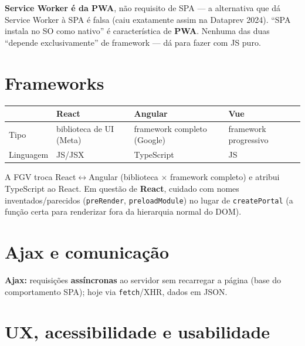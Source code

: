 \begin{pegadinha}
\textbf{Service Worker é da PWA}, não requisito de SPA --- a alternativa que
dá Service Worker à SPA é falsa (caiu exatamente assim na Dataprev 2024).
``SPA instala no SO como nativo'' é característica de \textbf{PWA}. Nenhuma
das duas ``depende exclusivamente'' de framework --- dá para fazer com JS
puro.
\end{pegadinha}

\section{Frameworks}

\begin{center}
\begin{tabular}{@{}p{2.2cm}p{3.4cm}p{3.4cm}p{2.6cm}@{}}
\toprule
& \textbf{React} & \textbf{Angular} & \textbf{Vue} \\
\midrule
Tipo & biblioteca de UI (Meta) & framework completo (Google) & framework progressivo \\
Linguagem & JS/JSX & TypeScript & JS \\
\bottomrule
\end{tabular}
\end{center}

\begin{pegadinha}
A FGV troca React$\leftrightarrow$Angular (biblioteca $\times$ framework
completo) e atribui TypeScript ao React. Em questão de \textbf{React},
cuidado com nomes inventados/parecidos (\texttt{preRender},
\texttt{preloadModule}) no lugar de \texttt{createPortal} (a função certa
para renderizar fora da hierarquia normal do DOM).
\end{pegadinha}

\section{Ajax e comunicação}

\textbf{Ajax:} requisições \textbf{assíncronas} ao servidor sem recarregar a
página (base do comportamento SPA); hoje via \texttt{fetch}/XHR, dados em
JSON.

\section{UX, acessibilidade e usabilidade}

